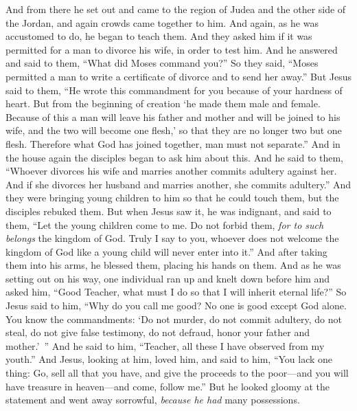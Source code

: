 \begin{biblechapter} %
 And from there he set out and came to the region of Judea and the other side of the Jordan, and again crowds came together to him. And again, as he was accustomed to do, he began to teach them.
\verse And they asked him if it was permitted for a man to divorce his wife, in order to test him.
\verse And he answered and said to them, “What did Moses command you?”
\verse So they said, “Moses permitted a man to write a certificate of divorce and to send her away.”
\verse But Jesus said to them, “He wrote this commandment for you because of your hardness of heart.
\verse But from the beginning of creation ‘he made them male and female.
\verse Because of this a man will leave his father and mother and will be joined to his wife,
\verse and the two will become one flesh,’ so that they are no longer two but one flesh.
\verse Therefore what God has joined together, man must not separate.”
\verse And in the house again the disciples began to ask him about this.
\verse And he said to them, “Whoever divorces his wife and marries another commits adultery against her.
\verse And if she divorces her husband and marries another, she commits adultery.”
 And they were bringing young children to him so that he could touch them, but the disciples rebuked them.
\verse But when Jesus saw it, he was indignant, and said to them, “Let the young children come to me. Do not forbid them, \textit{for to such belongs} the kingdom of God.
\verse Truly I say to you, whoever does not welcome the kingdom of God like a young child will never enter into it.”
\verse And after taking them into his arms, he blessed them, placing his hands on them.
 And as he was setting out on his way, one individual ran up and knelt down before him and asked him, “Good Teacher, what must I do so that I will inherit eternal life?”
\verse So Jesus said to him, “Why do you call me good? No one is good except God alone.
\verse You know the commandments: ‘Do not murder, do not commit adultery, do not steal, do not give false testimony, do not defraud, honor your father and mother.’ ”
\verse And he said to him, “Teacher, all these I have observed from my youth.”
\verse And Jesus, looking at him, loved him, and said to him, “You lack one thing: Go, sell all that you have, and give the proceeds to the poor—and you will have treasure in heaven—and come, follow me.”
\verse But he looked gloomy at the statement and went away sorrowful, \textit{because he had} many possessions.

\end{biblechapter}
